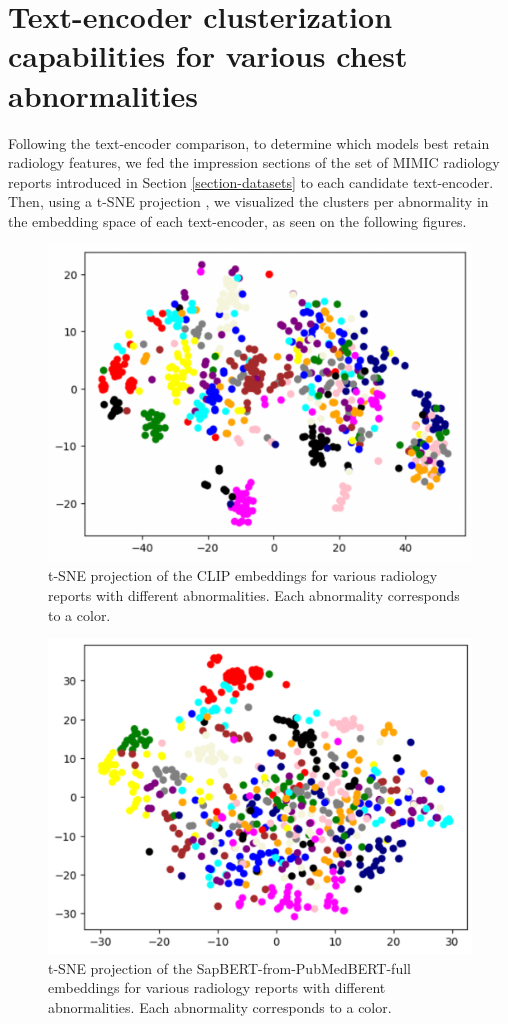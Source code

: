 \documentclass{article}
\begin{document}
\section{Text-encoder clusterization capabilities for various chest abnormalities}

Following the text-encoder comparison, to determine which models best retain radiology features, we fed the impression sections of the set of MIMIC radiology reports introduced in Section \ref{section-datasets} to each candidate text-encoder. Then, using a t-SNE projection \citep{JMLR:v9:vandermaaten08a}, we visualized the clusters per abnormality in the embedding space of each text-encoder, as seen on the following figures.

\begin{figure}[hbt!]
  \centering
    \includegraphics[width=130mm]{clusters_clip.png}
  \caption{t-SNE projection of the CLIP embeddings for various radiology reports with different abnormalities. Each abnormality corresponds to a color.}
  \label{clusters-clip}
\end{figure}

\begin{figure}[hbt!]
  \centering
    \includegraphics[width=130mm]{clusters_sap.png}
  \caption{t-SNE projection of the SapBERT-from-PubMedBERT-full embeddings for various radiology reports with different abnormalities. Each abnormality corresponds to a color.}
  \label{clusters-sap}
\end{figure}
\end{document}
